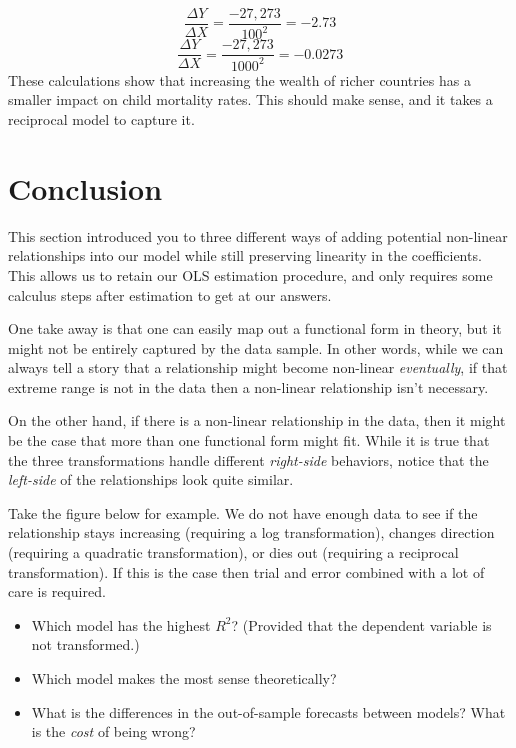 \documentclass[
]{book}
\begin{document}
\[\frac{\Delta Y}{\Delta X} = \frac{-27,273} {100^{2}} = -2.73\]
\[\frac{\Delta Y}{\Delta X} = \frac{-27,273} {1000^{2}} = -0.0273\]
These calculations show that increasing the wealth of richer countries has a smaller impact on child mortality rates. This should make sense, and it takes a reciprocal model to capture it.

\hypertarget{conclusion}{%
\section{Conclusion}\label{conclusion}}

This section introduced you to three different ways of adding potential non-linear relationships into our model while still preserving linearity in the coefficients. This allows us to retain our OLS estimation procedure, and only requires some calculus steps after estimation to get at our answers.

One take away is that one can easily map out a functional form in theory, but it might not be entirely captured by the data sample. In other words, while we can always tell a story that a relationship might become non-linear \emph{eventually}, if that extreme range is not in the data then a non-linear relationship isn't necessary.

On the other hand, if there is a non-linear relationship in the data, then it might be the case that more than one functional form might fit. While it is true that the three transformations handle different \emph{right-side} behaviors, notice that the \emph{left-side} of the relationships look quite similar.

Take the figure below for example. We do not have enough data to see if the relationship stays increasing (requiring a log transformation), changes direction (requiring a quadratic transformation), or dies out (requiring a reciprocal transformation). If this is the case then trial and error combined with a lot of care is required.

\begin{itemize}
\item
  Which model has the highest \(R^2\)? (Provided that the dependent variable is not transformed.)
\item
  Which model makes the most sense theoretically?
\item
  What is the differences in the out-of-sample forecasts between models? What is the \emph{cost} of being wrong?
\end{itemize}
\end{document}
